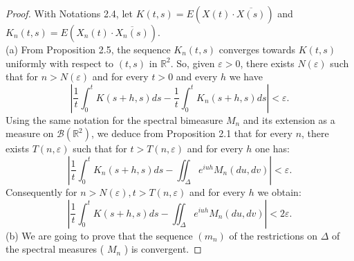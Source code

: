 \documentclass{article}
\begin{document}
\begin{proof}
With Notations 2.4, let \(K(t, s)=E(X(t) \cdot \overline{X(s)})\) and \(K_{n}(t, s)=E\left(X_{n}(t) \cdot \overline{X_{n}(s)}\right)\). \\
(a) From Proposition 2.5, the sequence \(K_{n}(t, s)\) converges towards \(K(t, s)\) uniformly with respect to \((t, s)\) in \(\mathbb{R}^{2}\). So, given \(\varepsilon>0\), there exists \(N(\varepsilon)\) such that for \(n>N(\varepsilon)\) and for every \(t>0\) and every \(h\) we have
\begin{equation} \label{eq:a1} %
\left|\frac{1}{t} \int_{0}^{t} K(s+h, s) d s-\frac{1}{t} \int_{0}^{t} K_{n}(s+h, s) d s\right|<\varepsilon .
\end{equation}
Using the same notation for the spectral bimeasure \(M_{n}\) and its extension as a measure on \(\mathscr{B}\left(\mathbb{R}^{2}\right)\), we deduce from Proposition 2.1 that for every \(n\), there exists \(T(n, \varepsilon)\) such that for \(t>T(n, \varepsilon)\) and for every \(h\) one has:
\begin{equation} \label{eq:a2}
\left|\frac{1}{t} \int_{0}^{t} K_{n}(s+h, s) d s-\iint_{\Delta} e^{i u h} M_{n}(d u, d v)\right|<\varepsilon .
\end{equation}
Consequently for \(n>N(\varepsilon), t>T(n, \varepsilon)\) and for every \(h\) we obtain:
\begin{equation} \label{eq:a3}
\left|\frac{1}{t} \int_{0}^{t} K(s+h, s) d s-\iint_{\Delta} e^{i u h} M_{n}(d u, d v)\right|<2 \varepsilon .
\end{equation}
(b) We are going to prove that the sequence \(\left(m_{n}\right)\) of the restrictions on \(\Delta\) of the spectral measures ( \(M_{n}\) ) is convergent.


\end{proof}
\end{document}
